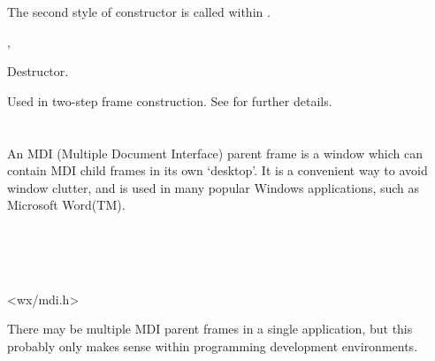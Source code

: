 



The second style of constructor is called within .


,\rtfsp
{}

\label{wxmdiclientwindowdtor}


Destructor.

\label{wxmdiclientwindowcreateclient}


Used in two-step frame construction. See \rtfsp
for further details.

\section{}\label{wxmdiparentframe}

An MDI (Multiple Document Interface) parent frame is a window which can contain
MDI child frames in its own `desktop'. It is a convenient way to avoid window clutter,
and is used in many popular Windows applications, such as Microsoft Word(TM).


\\
\\
\\


<wx/mdi.h>


There may be multiple MDI parent frames in a single application, but this probably only makes sense
within programming development environments.


